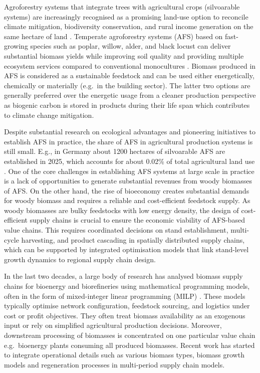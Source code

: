 \documentclass[preprint,review,1p,authoryear]{elsarticle} %
\begin{document}
Agroforestry systems that integrate trees with agricultural crops
(silvoarable systems) are increasingly recognised as a promising
land-use option to reconcile climate mitigation, biodiversity
conservation, and rural income generation on the same hectare of land
\citep{Toensmeier2017_Carbon_Agroforestry}. Temperate agroforestry systems
(AFS) based on fast-growing species such as poplar, willow, alder, and
black locust can deliver substantial biomass yields while improving soil
quality and providing multiple ecosystem services compared to
conventional monocultures \citep{Huber2018_SRAFS_growth}. Biomass produced
in AFS is considered as a sustainable feedstock and can be used either
energetically, chemically or materially (e.g.~in the building sector).
The latter two options are generally preferred over the energetic usage
from a cleaner production perspective as biogenic carbon is stored in
products during their life span which contributes to climate change
mitigation.

Despite substantial research on ecological advantages and pioneering
initiatives to establish AFS in practice, the share of AFS in
agricultural production systems is still small. E.g., in Germany about
1200 hectares of silvoarable AFS are established in 2025, which accounts
for about 0.02\% of total agricultural land use \citep{DEFAF}. One of the core
challenges in establishing AFS systems at large scale in practice is a
lack of opportunities to generate substantial revenues from woody
biomasses of AFS. On the other hand, the rise of bioeconomy creates
substantial demands for woody biomass and requires a reliable and
cost-efficient feedstock supply. As woody biomasses are bulky feedstocks
with low energy density, the design of cost-efficient supply chains is
crucial to ensure the economic viability of AFS-based value chains. This
requires coordinated decisions on stand establishment, multi-cycle
harvesting, and product cascading in spatially distributed supply
chains, which can be supported by integrated optimisation models that
link stand-level growth dynamics to regional supply chain design.

In the last two decades, a large body of research has analysed biomass
supply chains for bioenergy and biorefineries using mathematical
programming models, often in the form of mixed-integer linear
programming (MILP) \citep{Zahraee2020_BSC_review, Sharma2013_BSC_review}.
These models typically optimise network configuration, feedstock
sourcing, and logistics under cost or profit objectives. They often
treat biomass availability as an exogenous input or rely on simplified
agricultural production decisions. Moreover, downstream processing of
biomasses is concentrated on one particular value chain e.g.~bioenergy
plants consuming all produced biomasses. Recent work has started to
integrate operational details such as various biomass types, biomass
growth models and regeneration processes in multi-period supply chain
models.
\end{document}
